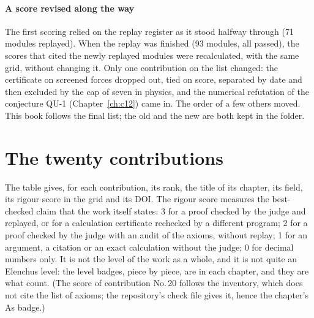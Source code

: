 \paragraph{A score revised along the way} The first scoring relied on the replay register as it stood halfway through
(71 modules replayed). When the replay was finished (93 modules, all passed), the scores that cited the newly replayed
modules were recalculated, with the same grid, without changing it. Only one contribution on the list changed: the
certificate on screened forces dropped out, tied on score, separated by date and then excluded by the cap of seven in
physics, and the numerical refutation of the conjecture QU-1 (Chapter~\ref{ch:c12}) came in. The order of a few
others moved. This book follows the final list; the old and the new are both kept in the folder.

\section{The twenty contributions}

The table gives, for each contribution, its rank, the title of its chapter, its field, its rigour score in the grid
and its DOI. The rigour score measures the best-checked claim that the work itself states: 3 for a proof checked by
the judge and replayed, or for a calculation certificate rechecked by a different program; 2 for a proof checked by
the judge with an audit of the axioms, without replay; 1 for an argument, a citation or an exact calculation without
the judge; 0 for decimal numbers only. It is not the level of the work as a whole, and it is not quite an Elenchus
level: the level badges, piece by piece, are in each chapter, and they are what count. (The score of contribution
No.\,20 follows the inventory, which does not cite the list of axioms; the repository's check file gives it, hence
the chapter's As badge.)

\begingroup
\small
\renewcommand{\arraystretch}{1.22}

\endgroup
